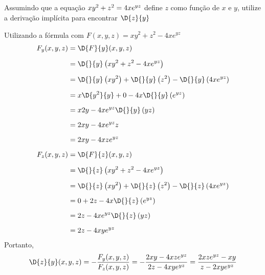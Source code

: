 \documentclass[a4paper,12pt,fleqn]{article}
\begin{document}
Assumindo que a equação
\(
  xy^2 + z^2 = 4xe^{yz}
  \vphantom{\int}
\)
define $z$ como função de $x$ e $y$,
utilize a derivação implícita para encontrar \(\D{z}{y}\)

\begin{answer}
  Utilizando a fórmula com \(F(x, y, z) = xy^2 + z^2 - 4xe^{yz}\)
  \begin{align*}
    F_y(x, y, z)
    & = \D{F}{y}(x, y, z) \\[2mm]
    & = \D{}{y} \left(xy^2 + z^2 - 4xe^{yz}\right) \\[2mm]
    & = \D{}{y} \left(xy^2\right)
    + \D{}{y} \left(z^2 \right)
    - \D{}{y} \left(4xe^{yz}\right) \\[2mm]
    & = x \D{y^2}{y} + 0 - 4x\D{}{y}\left(e^{yz}\right) \\[2mm]
    & = x2y - 4xe^{yz}\D{}{y}\left(yz\right) \\[2mm]
    & = 2xy - 4xe^{yz}z \\[2mm]
    & = 2xy - 4xze^{yz} \\[2mm]
    F_z(x, y, z)
    & = \D{F}{z}(x, y, z) \\[2mm]
    & = \D{}{z} \left(xy^2 + z^2 - 4xe^{yz}\right) \\[2mm]
    & = \D{}{z} \left(xy^2\right)
    + \D{}{z} \left(z^2 \right)
    - \D{}{z} \left(4xe^{yz}\right) \\[2mm]
    & = 0 + 2z - 4x\D{}{z}\left(e^{yz}\right) \\[2mm]
    & = 2z - 4xe^{yz}\D{}{z}\left(yz\right) \\[2mm]
    & = 2z - 4xye^{yz}
  \end{align*}
  Portanto,
  \[
  \D{z}{y}(x, y, z)
  = -\frac{F_y(x, y, z)}{F_z(x, y, z)}
  = -\frac{2xy - 4xze^{yz}}{2z - 4xye^{yz}}
  = \frac{2xze^{yz}- xy}{z - 2xye^{yz}}
  \]
\end{answer}

\end{document}
